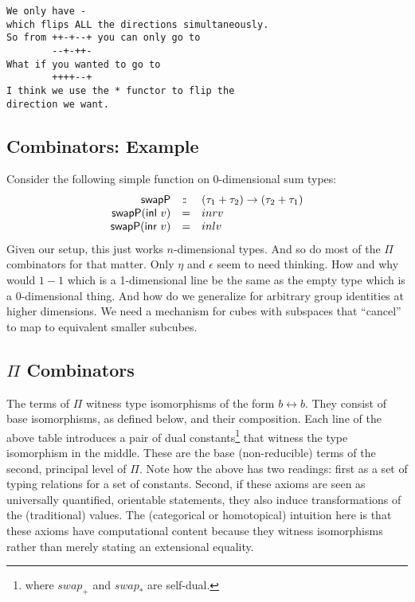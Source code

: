 \documentclass[authoryear,preprint]{sigplanconf}
\newcommand{\iso}{\leftrightarrow}
\newcommand{\swapp}{\mathit{swap}_+}
\newcommand{\swapt}{\mathit{swap}_*}
\newcommand{\inl}[1]{\textsf{inl}~#1}
\newcommand{\inr}[1]{\textsf{inr}~#1}
\newcommand{\hast}{:\mkern -2.5mu:\;}
\begin{document}
\begin{verbatim}
We only have -
which flips ALL the directions simultaneously.
So from ++-+--+ you can only go to
        --+-++-
What if you wanted to go to
        ++++--+
I think we use the * functor to flip the 
direction we want. 
\end{verbatim}

\subsection{Combinators: Example} 

Consider the following simple function on 0-dimensional sum types:
\[\begin{array}{rcl}
\textsf{swapP} &\hast& (\tau_1 + \tau_2) \rightarrow (\tau_2 + \tau_1) \\
\textsf{swapP} (\inl{v}) &=& inr{v} \\
\textsf{swapP} (\inr{v}) &=& inl{v}
\end{array}\]
Given our setup, this just works $n$-dimensional types. And so do most of the
$\Pi$ combinators for that matter. Only $\eta$ and $\epsilon$ seem to need
thinking. How and why would $1-1$ which is a 1-dimensional line be the same
as the empty type which is a 0-dimensional thing. And how do we generalize
for arbitrary group identities at higher dimensions. We need a mechanism for
cubes with subspaces that ``cancel'' to map to equivalent smaller subcubes.

\subsection{$\Pi$ Combinators} 

The terms of $\Pi$ witness type isomorphisms of the form $b \iso b$. They
consist of base isomorphisms, as defined below, and their composition. Each
line of the above table introduces a pair of dual constants\footnote{where
  $\swapp$ and $\swapt$ are self-dual.} that witness the type isomorphism in
the middle.  These are the base (non-reducible) terms of the second,
principal level of $\Pi$. Note how the above has two readings: first as a set
of typing relations for a set of constants. Second, if these axioms are seen
as universally quantified, orientable statements, they also induce
transformations of the (traditional) values. The (categorical or homotopical)
intuition here is that these axioms have computational content because they
witness isomorphisms rather than merely stating an extensional equality.
\end{document}
